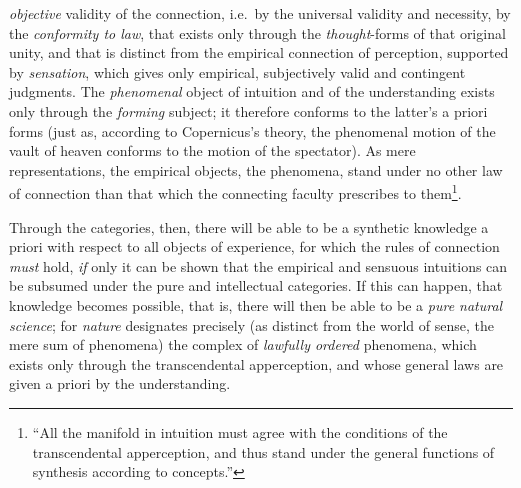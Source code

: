  \setcounter{footnote}{0}
\emph{objective} validity of the connection, i.e.\ by the universal
validity and necessity, by the \emph{conformity to law}, that exists only
through the \emph{thought}-forms of that original unity, and that is
distinct from the empirical connection of perception, supported by
\emph{sensation}, which gives only empirical, subjectively valid and
contingent judgments. The \emph{phenomenal} object of intuition and of
the understanding exists only through the \emph{forming} subject; it
therefore conforms to the latter's a priori forms (just as, according to
Copernicus's theory, the phenomenal motion of the vault of heaven
conforms to the motion of the spectator). As mere representations, the
empirical objects, the phenomena, stand under no other law of connection
than that which the connecting faculty prescribes to
them\footnote{``All the manifold in intuition must agree with the
conditions of the transcendental apperception, and thus stand under the
general functions of synthesis according to concepts.''}.

Through the categories, then, there will be able to be a synthetic
knowledge a priori with respect to all objects of experience, for which
the rules of connection \emph{must} hold, \emph{if} only it can be shown
that the empirical and sensuous intuitions can be subsumed under the pure
and intellectual categories. If this can happen, that knowledge becomes
possible, that is, there will then be able to be a \emph{pure natural
science}; for \emph{nature} designates precisely (as distinct from the
world of sense, the mere sum of phenomena) the complex of \emph{lawfully
ordered} phenomena, which exists only through the transcendental
apperception, and whose general laws are given a priori by the
understanding.

